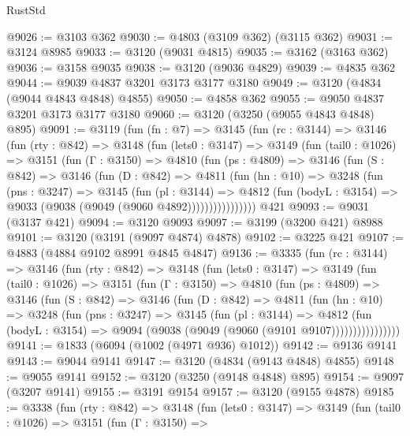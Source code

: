 \begin{lexlean}{RustStd}
\begin{coremodule}
{\begin{coremodule}
{{{{{{{{{{{{{{{{{{{{{{{{{{@9026 := @3103 @362
@9030 := @4803 (@3109 @362) (@3115 @362)
@9031 := @3124 @8985
@9033 := @3120 (@9031 @4815)
@9035 := @3162 (@3163 @362)
@9036 := @3158 @9035
@9038 := @3120 (@9036 @4829)
@9039 := @4835 @362
@9044 := @9039 @4837 @3201 @3173 @3177 @3180
@9049 := @3120 (@4834 (@9044 @4843 @4848) @4855)
@9050 := @4858 @362
@9055 := @9050 @4837 @3201 @3173 @3177 @3180
@9060 := @3120 (@3250 (@9055 @4843 @4848) @895)
@9091 := @3119
    (fun (fn : @7) =>
    @3145
      (fun (rc : @3144) =>
      @3146
        (fun (rty : @842) =>
        @3148
          (fun (lets0 : @3147) =>
          @3149
            (fun (tail0 : @1026) =>
            @3151
              (fun (Γ : @3150) =>
              @4810
                (fun (ps : @4809) =>
                @3146
                  (fun (S : @842) =>
                  @3146
                    (fun (D : @842) =>
                    @4811
                      (fun (hn : @10) =>
                      @3248
                        (fun (pns : @3247) =>
                        @3145
                          (fun (pl : @3144) =>
                          @4812
                            (fun (bodyL : @3154) => @9033 (@9038 (@9049 (@9060 @4892))))))))))))))))
    @421
@9093 := @9031 (@3137 @421)
@9094 := @3120 @9093
@9097 := @3199 (@3200 @421) @8988
@9101 := @3120 (@3191 (@9097 @4874) @4878)
@9102 := @3225 @421
@9107 := @4883 (@4884 @9102 @8991 @4845 @4847)
@9136 := @3335
    (fun (rc : @3144) =>
    @3146
      (fun (rty : @842) =>
      @3148
        (fun (lets0 : @3147) =>
        @3149
          (fun (tail0 : @1026) =>
          @3151
            (fun (Γ : @3150) =>
            @4810
              (fun (ps : @4809) =>
              @3146
                (fun (S : @842) =>
                @3146
                  (fun (D : @842) =>
                  @4811
                    (fun (hn : @10) =>
                    @3248
                      (fun (pns : @3247) =>
                      @3145
                        (fun (pl : @3144) =>
                        @4812
                          (fun (bodyL : @3154) =>
                          @9094 (@9038 (@9049 (@9060 (@9101 @9107))))))))))))))))
@9141 := @1833 (@6094 (@1002 (@4971 @936) @1012))
@9142 := @9136 @9141
@9143 := @9044 @9141
@9147 := @3120 (@4834 (@9143 @4848) @4855)
@9148 := @9055 @9141
@9152 := @3120 (@3250 (@9148 @4848) @895)
@9154 := @9097 (@3207 @9141)
@9155 := @3191 @9154
@9157 := @3120 (@9155 @4878)
@9185 := @3338
    (fun (rty : @842) =>
    @3148
      (fun (lets0 : @3147) =>
      @3149
        (fun (tail0 : @1026) =>
        @3151
          (fun (Γ : @3150) =>
}}}}}}}}}}}}}}}}}}}}}}}}}}
\end{coremodule}}
\end{coremodule}
\end{lexlean}
